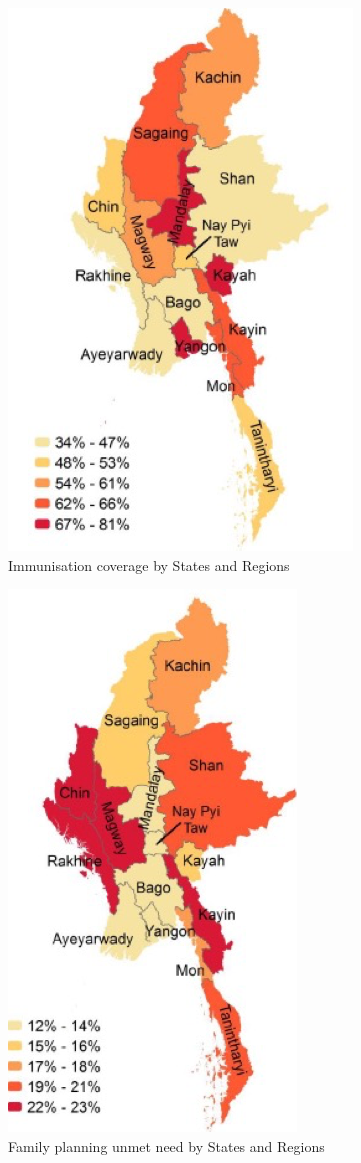 \documentclass[12pt,a4paper]{article}
\begin{document}
\begin{figure}[H]

{\centering \includegraphics[width=0.5\linewidth]{figures/kayah2} 

}

\caption{Immunisation coverage by States and Regions}\label{fig:myanmarMap2}
\end{figure}

\begin{figure}[H]

{\centering \includegraphics[width=0.5\linewidth]{figures/kayah3} 

}

\caption{Family planning unmet need by States and Regions}\label{fig:myanmarMap3}
\end{figure}
\end{document}
